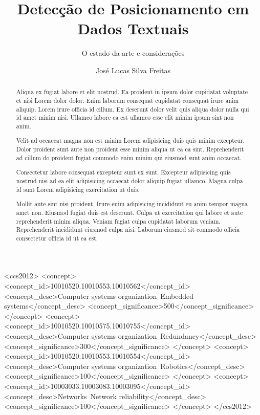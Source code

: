 \documentclass[sigconf]{acmart}
\begin{document}
\title{Detecção de Posicionamento em Dados Textuais}
\subtitle{O estado da arte e considerações}


\author{José Lucas Silva Freitas}

\renewcommand{\shortauthors}{Lucas Freitas et al.}


\begin{abstract}
Aliqua ex fugiat labore et elit nostrud. 
Ea proident in ipsum dolor cupidatat voluptate et nisi Lorem dolor dolor. 
Enim laborum consequat cupidatat consequat irure anim aliquip. 
Lorem irure officia id cillum. 
Ex deserunt dolor velit quis aliqua dolor nulla qui id amet minim nisi. 
Ullamco labore ea est ullamco esse elit minim ipsum sint non anim.

Velit ad occaecat magna non est minim Lorem adipisicing duis quis minim excepteur. 
Dolor proident sunt aute non proident esse minim aliqua ut ea ea sint. 
Reprehenderit ad cillum do proident fugiat commodo enim minim qui eiusmod sunt anim occaecat.

Consectetur labore consequat excepteur sunt ex sunt. 
Excepteur adipisicing quis nostrud nisi ad ea elit adipisicing occaecat dolor aliquip fugiat ullamco. Magna culpa id sunt Lorem adipisicing exercitation ut duis.

Mollit aute sint nisi proident. Irure enim adipisicing incididunt eu anim tempor magna amet non. Eiusmod fugiat duis est deserunt. Culpa ut exercitation qui labore et aute reprehenderit minim aliqua. Veniam fugiat culpa cupidatat laborum veniam. Reprehenderit incididunt eiusmod culpa nisi. Laborum eiusmod sit commodo officia consectetur officia id ut ea est.
\end{abstract}

%
%
\begin{CCSXML}
<ccs2012>
 <concept>
  <concept_id>10010520.10010553.10010562</concept_id>
  <concept_desc>Computer systems organization~Embedded systems</concept_desc>
  <concept_significance>500</concept_significance>
 </concept>
 <concept>
  <concept_id>10010520.10010575.10010755</concept_id>
  <concept_desc>Computer systems organization~Redundancy</concept_desc>
  <concept_significance>300</concept_significance>
 </concept>
 <concept>
  <concept_id>10010520.10010553.10010554</concept_id>
  <concept_desc>Computer systems organization~Robotics</concept_desc>
  <concept_significance>100</concept_significance>
 </concept>
 <concept>
  <concept_id>10003033.10003083.10003095</concept_id>
  <concept_desc>Networks~Network reliability</concept_desc>
  <concept_significance>100</concept_significance>
 </concept>
</ccs2012>
\end{CCSXML}
\end{document}
